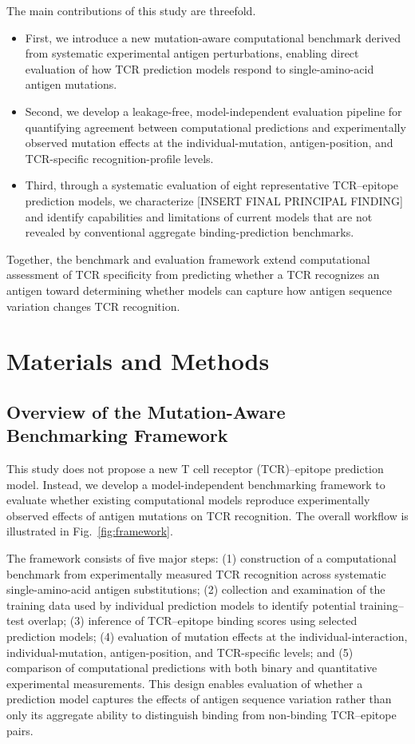 The main contributions of this study are threefold. 
\begin{itemize}
    \item First, we introduce a new mutation-aware computational benchmark derived from systematic experimental antigen perturbations, enabling direct evaluation of how TCR prediction models respond to single-amino-acid antigen mutations. 
    \item Second, we develop a leakage-free, model-independent evaluation pipeline for quantifying agreement between computational predictions and experimentally observed mutation effects at the individual-mutation, antigen-position, and TCR-specific recognition-profile levels. 
    \item Third, through a systematic evaluation of eight representative TCR–epitope prediction models, we characterize [INSERT FINAL PRINCIPAL FINDING] and identify capabilities and limitations of current models that are not revealed by conventional aggregate binding-prediction benchmarks. 
\end{itemize}
Together, the benchmark and evaluation framework extend computational assessment of TCR specificity from predicting whether a TCR recognizes an antigen toward determining whether models can capture how antigen sequence variation changes TCR recognition.


\section{Materials and Methods}

\subsection{Overview of the Mutation-Aware Benchmarking Framework}

This study does not propose a new T cell receptor (TCR)--epitope 
prediction model. Instead, we develop a model-independent benchmarking 
framework to evaluate whether existing computational models reproduce 
experimentally observed effects of antigen mutations on TCR recognition. 
The overall workflow is illustrated in Fig.~\ref{fig:framework}.

The framework consists of five major steps: 
(1) construction of a computational benchmark from experimentally measured TCR recognition across systematic single-amino-acid antigen substitutions; 
(2) collection and examination of the training data used by individual prediction models to identify potential training--test overlap; 
(3) inference of TCR--epitope binding scores using selected prediction models; 
(4) evaluation of mutation effects at the individual-interaction, individual-mutation, antigen-position, and TCR-specific levels; and 
(5) comparison of computational predictions with both binary and quantitative 
experimental measurements. This design enables evaluation of whether a prediction model captures the effects of antigen sequence variation rather 
than only its aggregate ability to distinguish binding from non-binding 
TCR--epitope pairs.


